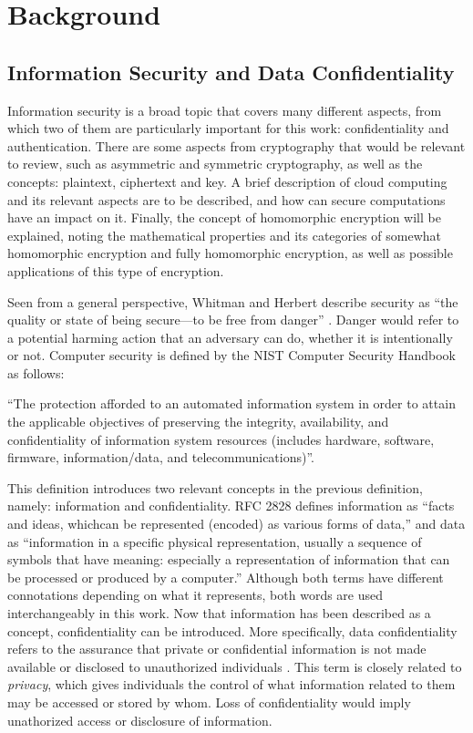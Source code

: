 \chapter{Background}
\label{background}

\section{Information Security and Data Confidentiality}

Information security is a broad topic that covers many different aspects, from which two of them are particularly important for this work: confidentiality and authentication. There are some aspects from cryptography that would be relevant to review, such as asymmetric and symmetric cryptography, as well as the concepts: plaintext, ciphertext and key. A brief description of cloud computing and its relevant aspects are to be described, and how can secure computations have an impact on it. Finally, the concept of homomorphic encryption will be explained, noting the mathematical properties and its categories of somewhat homomorphic encryption and fully homomorphic encryption, as well as possible applications of this type of encryption.

Seen from a general perspective, Whitman and Herbert describe security as ``the quality or state of being secure---to be free from danger'' \cite{PrinciplesInformationSecurity}. Danger would refer to a potential harming action that an adversary can do, whether it is intentionally or not. Computer security is defined by the NIST Computer Security Handbook as follows:

``The protection afforded to an automated information system in order to attain the applicable objectives of preserving the integrity, availability, and confidentiality of information system resources (includes hardware, software, firmware, information/data, and telecommunications)''.

This definition introduces two relevant concepts in the previous definition, namely: information and confidentiality. RFC 2828 defines information as ``facts and ideas, whichcan be represented (encoded) as various forms of data,'' and data as ``information in a specific physical representation, usually a sequence of symbols that have meaning: especially a representation of information that can be processed or produced by a computer.'' Although both terms have different connotations depending on what it represents, both words are used interchangeably in this work. Now that information has been described as a concept, confidentiality can be introduced. More specifically, data confidentiality refers to the assurance that private or confidential information is not made available or disclosed to unauthorized individuals \cite{CryptoStallings}. This term is closely related to \textit{privacy}, which gives individuals the control of what information related to them may be accessed or stored by whom. Loss of confidentiality would imply unathorized access or disclosure of information.

